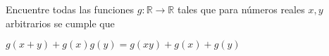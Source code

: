 \begin{problem}
	Encuentre todas las funciones $g: \mathbb{R} \to \mathbb{R}$ tales que para números reales $x, y$ arbitrarios se cumple que
	\begin{center}
		$g(x+y) + g(x)g(y) = g(x y) + g(x) + g(y)$
	\end{center}
\end{problem}
